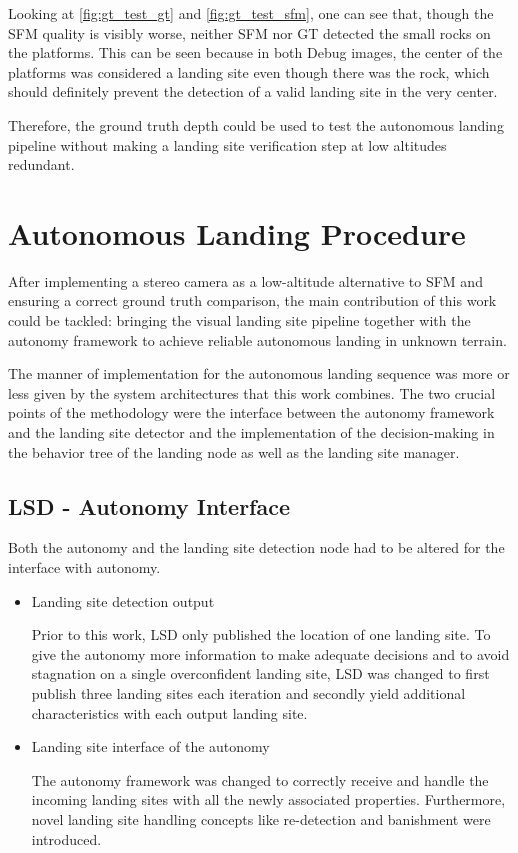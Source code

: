Looking at \cref{fig:gt_test_gt} and \cref{fig:gt_test_sfm}, one can see that, though the SFM quality is visibly worse, neither SFM nor GT detected the small rocks on the platforms. This can be seen because in both Debug images, the center of the platforms was considered a landing site even though there was the rock, which should definitely prevent the detection of a valid landing site in the very center.

Therefore, the ground truth depth could be used to test the autonomous landing pipeline without making a landing site verification step at low altitudes redundant.

\clearpage %
\section{Autonomous Landing Procedure}

After implementing a stereo camera as a low-altitude alternative to SFM and ensuring a correct ground truth comparison, the main contribution of this work could be tackled: bringing the visual landing site pipeline together with the autonomy framework to achieve reliable autonomous landing in unknown terrain.

The manner of implementation for the autonomous landing sequence was more or less given by the system architectures that this work combines. The two crucial points of the methodology were the interface between the autonomy framework and the landing site detector and the implementation of the decision-making in the behavior tree of the landing node as well as the landing site manager.

\subsection{LSD - Autonomy Interface}

Both the autonomy and the landing site detection node had to be altered for the interface with autonomy.

\begin{itemize}
    \item Landing site detection output

    Prior to this work, LSD only published the location of one landing site. To give the autonomy more information to make adequate decisions and to avoid stagnation on a single overconfident landing site, LSD was changed to first publish three landing sites each iteration and secondly yield additional characteristics with each output landing site.
    \item Landing site interface of the autonomy

    The autonomy framework was changed to correctly receive and handle the incoming landing sites with all the newly associated properties. Furthermore, novel landing site handling concepts like re-detection and banishment were introduced.    
\end{itemize}

